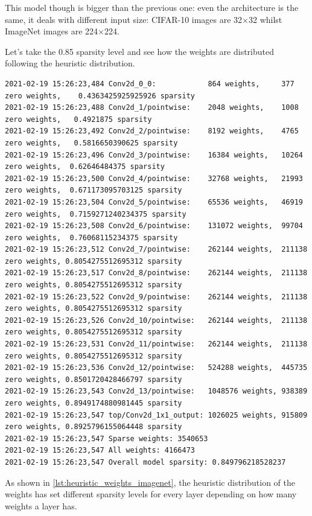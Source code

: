 This model though is bigger than the previous one: even the architecture is the
same, it deals with different input size: CIFAR-10 images are 32$\times$32
whilst ImageNet images are 224$\times$224.

Let's take the 0.85 sparsity level and see how the weights are distributed
following the heuristic distribution.

\begin{lstlisting}[label={lst:heuristic_weights_imagenet},
    caption=MobileNet v1 and ImageNet: heuristic weights distributions]
2021-02-19 15:26:23,484 Conv2d_0_0:            864 weights,     377 zero weights,    0.4363425925925926 sparsity
2021-02-19 15:26:23,488 Conv2d_1/pointwise:    2048 weights,    1008 zero weights,   0.4921875 sparsity
2021-02-19 15:26:23,492 Conv2d_2/pointwise:    8192 weights,    4765 zero weights,   0.5816650390625 sparsity
2021-02-19 15:26:23,496 Conv2d_3/pointwise:    16384 weights,   10264 zero weights,  0.62646484375 sparsity
2021-02-19 15:26:23,500 Conv2d_4/pointwise:    32768 weights,   21993 zero weights,  0.671173095703125 sparsity
2021-02-19 15:26:23,504 Conv2d_5/pointwise:    65536 weights,   46919 zero weights,  0.7159271240234375 sparsity
2021-02-19 15:26:23,508 Conv2d_6/pointwise:    131072 weights,  99704 zero weights,  0.76068115234375 sparsity
2021-02-19 15:26:23,512 Conv2d_7/pointwise:    262144 weights,  211138 zero weights, 0.8054275512695312 sparsity
2021-02-19 15:26:23,517 Conv2d_8/pointwise:    262144 weights,  211138 zero weights, 0.8054275512695312 sparsity
2021-02-19 15:26:23,522 Conv2d_9/pointwise:    262144 weights,  211138 zero weights, 0.8054275512695312 sparsity
2021-02-19 15:26:23,526 Conv2d_10/pointwise:   262144 weights,  211138 zero weights, 0.8054275512695312 sparsity
2021-02-19 15:26:23,531 Conv2d_11/pointwise:   262144 weights,  211138 zero weights, 0.8054275512695312 sparsity
2021-02-19 15:26:23,536 Conv2d_12/pointwise:   524288 weights,  445735 zero weights, 0.8501720428466797 sparsity
2021-02-19 15:26:23,543 Conv2d_13/pointwise:   1048576 weights, 938389 zero weights, 0.8949174880981445 sparsity
2021-02-19 15:26:23,547 top/Conv2d_1x1_output: 1026025 weights, 915809 zero weights, 0.8925796155064448 sparsity
2021-02-19 15:26:23,547 Sparse weights: 3540653
2021-02-19 15:26:23,547 All weights: 4166473
2021-02-19 15:26:23,547 Overall model sparsity: 0.849796218528237
\end{lstlisting}

As shown in \autoref{lst:heuristic_weights_imagenet}, the heuristic
distribution of the weights has set different sparsity levels for every layer
depending on how many weights a layer has.

